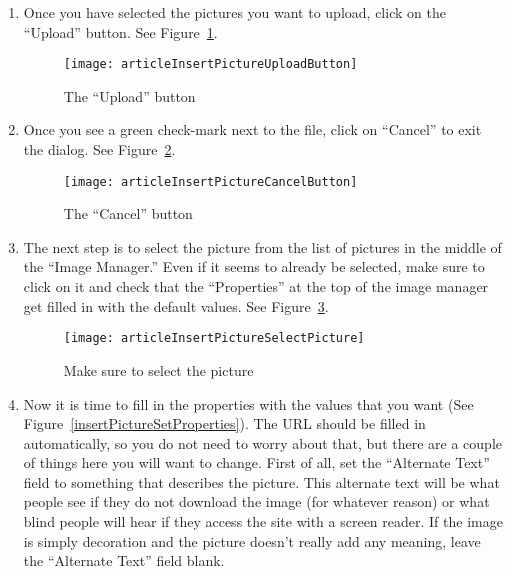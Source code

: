 \documentclass{howto}
\begin{document}
\begin{enumerate}
\item{Once you have selected the pictures you want to upload, click on the “Upload” button.  See Figure~\ref{insertPictureUploadButton}.}

\begin{figure}[h]
  \begin{center}
    \texttt{[image: articleInsertPictureUploadButton]}
  \end{center}
  \caption{The ``Upload'' button}
  \label{insertPictureUploadButton}
\end{figure}


\item{Once you see a green check-mark next to the file, click on “Cancel” to exit the dialog.  See Figure~\ref{insertPictureCancelButton}.}

\begin{figure}[h]
  \begin{center}
    \texttt{[image: articleInsertPictureCancelButton]}
  \end{center}
  \caption{The ``Cancel'' button}
  \label{insertPictureCancelButton}
\end{figure}

\item{The next step is to select the picture from the list of pictures in the middle of the “Image Manager.” Even if it seems to already be selected, make sure to click on it and check that the “Properties” at the top of the image manager get filled in with the default values.  See Figure~\ref{insertPictureSelectPicture}.}

\begin{figure}[h]
  \begin{center}
    \texttt{[image: articleInsertPictureSelectPicture]}
  \end{center}
  \caption{Make sure to select the picture}
  \label{insertPictureSelectPicture}
\end{figure}

\item{Now it is time to fill in the properties with the values that you want (See Figure~\ref{insertPictureSetProperties}).  The URL should be filled in automatically, so you do not need to worry about that, but there are a couple of things here you will want to change.  First of all, set the “Alternate Text” field to something that describes the picture.  This alternate text will be what people see if they do not download the image (for whatever reason) or what blind people will hear if they access the site with a screen reader.  If the image is simply decoration and the picture doesn't really add any meaning, leave the “Alternate Text” field blank.}


\end{enumerate}
\end{document}
